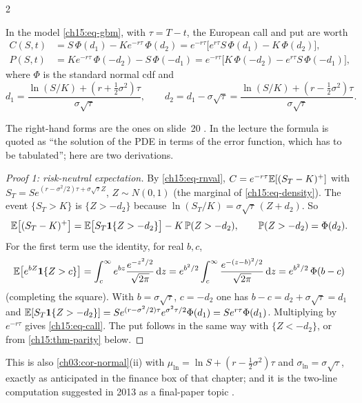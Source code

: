 \begin{paracol}{2}
\begin{theorem}\label{ch15:thm-bs}
In the model \eqref{ch15:eq-gbm}, with $\tau=T-t$, the European call and put are worth
\begin{align}
  C(S,t)&=S\,\Phi(d_1)-Ke^{-r\tau}\,\Phi(d_2)=e^{-r\tau}\bigl[e^{r\tau}S\,\Phi(d_1)-K\,\Phi(d_2)\bigr],\label{ch15:eq-call}\\
  P(S,t)&=Ke^{-r\tau}\,\Phi(-d_2)-S\,\Phi(-d_1)=e^{-r\tau}\bigl[K\,\Phi(-d_2)-e^{r\tau}S\,\Phi(-d_1)\bigr],\label{ch15:eq-put}
\end{align}
where $\Phi$ is the standard normal cdf and
\begin{equation}\label{ch15:eq-d12}
  d_1=\frac{\ln(S/K)+(r+\tfrac12\sigma^2)\tau}{\sigma\sqrt\tau},\qquad d_2=d_1-\sigma\sqrt\tau=\frac{\ln(S/K)+(r-\tfrac12\sigma^2)\tau}{\sigma\sqrt\tau}.
\end{equation}
\end{theorem}
The right-hand forms are the ones on slide~20 . In the lecture the formula is quoted as ``the solution of the PDE in terms of the error function, which has to be tabulated''; here are two derivations.

\begin{proof}[Proof 1: risk-neutral expectation]
By \eqref{ch15:eq-rnval}, $C=e^{-r\tau}\mathbb{E}[(S_T-K)^+]$ with $S_T=Se^{(r-\sigma^2/2)\tau+\sigma\sqrt\tau Z}$, $Z\sim N(0,1)$ (the marginal of \eqref{ch15:eq-density}). The event $\{S_T>K\}$ is
$\{Z>-d_2\}$ because $\ln(S_T/K)=\sigma\sqrt\tau\,(Z+d_2)$. So
\[
  \mathbb{E}\bigl[(S_T-K)^+\bigr]=\mathbb{E}\bigl[S_T\mathbf{1}\{Z>-d_2\}\bigr]-K\,\mathbb{P}(Z>-d_2),\qquad\mathbb{P}(Z>-d_2)=\Phi(d_2).
\]
For the first term use the identity, for real $b,c$,
\[
  \mathbb{E}\bigl[e^{bZ}\mathbf{1}\{Z>c\}\bigr]=\int_c^\infty e^{bz}\frac{e^{-z^2/2}}{\sqrt{2\pi}}\,\mathrm{d} z=e^{b^2/2}\int_c^\infty\frac{e^{-(z-b)^2/2}}{\sqrt{2\pi}}\,\mathrm{d} z=e^{b^2/2}\,\Phi(b-c)
\]
(completing the square). With $b=\sigma\sqrt\tau$, $c=-d_2$ one has $b-c=d_2+\sigma\sqrt\tau=d_1$ and
$\mathbb{E}[S_T\mathbf{1}\{Z>-d_2\}]=Se^{(r-\sigma^2/2)\tau}e^{\sigma^2\tau/2}\Phi(d_1)=Se^{r\tau}\Phi(d_1)$. Multiplying by $e^{-r\tau}$ gives \eqref{ch15:eq-call}. The put follows in the same way with
$\{Z<-d_2\}$, or from \cref{ch15:thm-parity} below.
\end{proof}
This is also \cref{ch03:cor-normal}(ii) with $\mu_{\ln}=\ln S+(r-\tfrac12\sigma^2)\tau$ and $\sigma_{\ln}=\sigma\sqrt\tau$, exactly as anticipated in the finance box of that chapter; and it is the
two-line computation suggested in 2013 as a final-paper topic .


\end{paracol}
